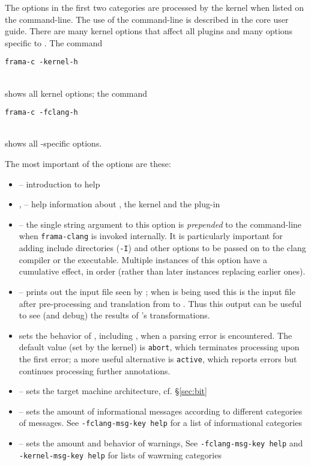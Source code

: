 The options in the first two categories are processed by the \fc kernel when listed on the \fc command-line. 
The use of the \fc command-line is described in the core \fc 
user guide.
There are many kernel options that affect all plugins and many options specific to \fclang.
The command \\
\centerline{\lstinline|frama-c -kernel-h|} \\
shows all kernel options; the command\\
\centerline{\lstinline|frama-c -fclang-h|} \\
shows all \fcl-specific options.

The most important of the options are these:
\begin{itemize}
\item {} -- introduction to \framac help
    \item {},  -- help information about \fc, the \fc kernel and the \fcl plug-in
	\item {} -- the single string argument to this option is \textit{prepended} to the command-line when 
	\lstinline|frama-clang| is invoked internally. It is particularly 
	important for adding include directories (\lstinline|-I|) and
	other options to be passed on to the clang compiler or the \irg executable. 
	Multiple instances of this option have a cumulative effect, in order (rather
	than later instances replacing earlier ones).
    \item {} -- prints out the input file seen by \fc; when \fcl is being used this is the input file after pre-processing and translation from \cpp to \C. Thus this output can be useful to see (and debug) the results of \fcl's transformations.
    \item {} sets the behavior of \framac, including \fclang, when a parsing error is encountered. The default value (set by the kernel) is \texttt{abort}, which terminates processing upon the first error; a more useful alternative is \texttt{active}, which reports errors but continues processing further annotations.
	\item {} -- sets the target machine architecture, cf. \S\ref{sec:bit}
	\item {} -- sets the amount of informational messages according to different categories of messages.
See \lstinline|-fclang-msg-key help| for a list of informational categories
	\item {} -- sets the amount and behavior of warnings, See \lstinline|-fclang-msg-key help| and \lstinline|-kernel-msg-key help| for lists of wawrning categories

\end{itemize}
